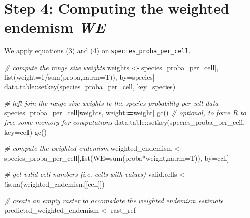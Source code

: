 \documentclass[
]{article}
\newenvironment{Shaded}{\begin{snugshade}}{\end{snugshade}}
\newcommand{\AttributeTok}[1]{\textcolor[rgb]{0.77,0.63,0.00}{#1}}
\newcommand{\CommentTok}[1]{\textcolor[rgb]{0.56,0.35,0.01}{\textit{#1}}}
\newcommand{\DecValTok}[1]{\textcolor[rgb]{0.00,0.00,0.81}{#1}}
\newcommand{\ErrorTok}[1]{\textcolor[rgb]{0.64,0.00,0.00}{\textbf{#1}}}
\newcommand{\FunctionTok}[1]{\textcolor[rgb]{0.00,0.00,0.00}{#1}}
\newcommand{\NormalTok}[1]{#1}
\newcommand{\OtherTok}[1]{\textcolor[rgb]{0.56,0.35,0.01}{#1}}
\newcommand{\SpecialCharTok}[1]{\textcolor[rgb]{0.00,0.00,0.00}{#1}}
\newcommand{\StringTok}[1]{\textcolor[rgb]{0.31,0.60,0.02}{#1}}
\begin{document}
\hypertarget{step-4-computing-the-weighted-endemism-we}{%
\section{\texorpdfstring{Step 4: Computing the weighted endemism
\emph{WE}}{Step 4: Computing the weighted endemism WE}}\label{step-4-computing-the-weighted-endemism-we}}

We apply equations (3) and (4) on \texttt{species\_proba\_per\_cell}.

\begin{Shaded}
\begin{Highlighting}[]

\CommentTok{\# compute the range size weights}
\NormalTok{weights }\OtherTok{\textless{}{-}}\NormalTok{ species\_proba\_per\_cell[, }\FunctionTok{list}\NormalTok{(}\AttributeTok{weight=}\DecValTok{1}\SpecialCharTok{/}\FunctionTok{sum}\NormalTok{(proba,}\AttributeTok{na.rm=}\NormalTok{T)), by}\OtherTok{=}\NormalTok{species]}
\NormalTok{data.table}\SpecialCharTok{::}\FunctionTok{setkey}\NormalTok{(species\_proba\_per\_cell, }\AttributeTok{key=}\StringTok{\textquotesingle{}species\textquotesingle{}}\NormalTok{)}

\CommentTok{\# left join the range size weights to the species probability per cell data}
\NormalTok{species\_proba\_per\_cell[weights, weight}\SpecialCharTok{:}\ErrorTok{=}\NormalTok{weight]}
\FunctionTok{gc}\NormalTok{() }\CommentTok{\# optional, to force R to free some memory for computations}
\NormalTok{data.table}\SpecialCharTok{::}\FunctionTok{setkey}\NormalTok{(species\_proba\_per\_cell, }\AttributeTok{key=}\StringTok{\textquotesingle{}cell\textquotesingle{}}\NormalTok{)}
\FunctionTok{gc}\NormalTok{()}

\CommentTok{\# compute the weighted endemism}
\NormalTok{weighted\_endemism }\OtherTok{\textless{}{-}}\NormalTok{ species\_proba\_per\_cell[,}\FunctionTok{list}\NormalTok{(}\AttributeTok{WE=}\FunctionTok{sum}\NormalTok{(proba}\SpecialCharTok{*}\NormalTok{weight,}\AttributeTok{na.rm=}\NormalTok{T)),}
\NormalTok{                                            by}\OtherTok{=}\NormalTok{cell]}

\CommentTok{\# get valid cell numbers (i.e. cells with values)}
\NormalTok{valid.cells }\OtherTok{\textless{}{-}} \SpecialCharTok{!}\FunctionTok{is.na}\NormalTok{(weighted\_endemism[[}\StringTok{\textquotesingle{}cell\textquotesingle{}}\NormalTok{]])}

\CommentTok{\# create an empty raster to accomodate the weighted endemism estimate}
\NormalTok{predicted\_weighted\_endemism }\OtherTok{\textless{}{-}}\NormalTok{ rast\_ref}


\end{Highlighting}
\end{Shaded}
\end{document}
